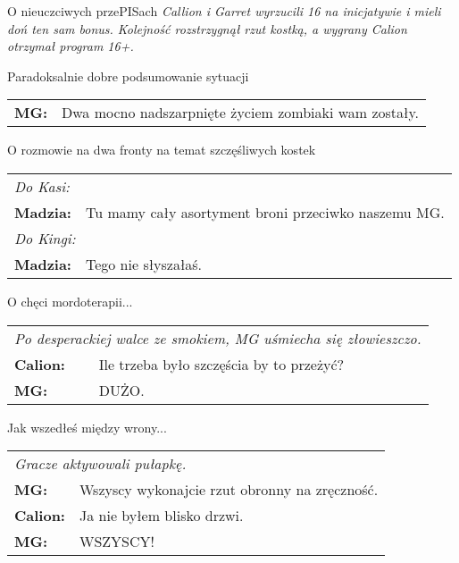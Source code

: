 \documentclass[10pt,twoside,twocolumn]{book}
\begin{document}
\begin{rpg-quotebox}{O nieuczciwych przePISach}
   \textit{Callion i Garret wyrzucili 16 na inicjatywie i mieli doń ten sam bonus. Kolejność rozstrzygnął rzut kostką, a wygrany Calion otrzymał program 16+.}
\end{rpg-quotebox}


\begin{rpg-quotebox}{Paradoksalnie dobre podsumowanie sytuacji}
   \begin{tabularx}{\columnwidth}{lX}
      \textbf{MG:} & Dwa mocno nadszarpnięte życiem zombiaki wam zostały.\\
   \end{tabularx}
\end{rpg-quotebox}


\begin{rpg-quotebox}{O rozmowie na dwa fronty na temat szczęśliwych kostek}
   \begin{tabularx}{\columnwidth}{lX}
      \multicolumn{2}{l}{\textit{Do Kasi:}} \\
      \textbf{Madzia:} & Tu mamy cały asortyment broni przeciwko naszemu MG. \\
      \multicolumn{2}{l}{\textit{Do Kingi:}} \\
      \textbf{Madzia:} & Tego nie słyszałaś.
   \end{tabularx}
\end{rpg-quotebox}


\begin{rpg-quotebox}{O chęci mordoterapii...}
   \begin{tabularx}{\columnwidth}{lX}
      \multicolumn{2}{X}{\textit{Po desperackiej walce ze smokiem, MG uśmiecha się złowieszczo.}}\\
      \textbf{Calion:} & Ile trzeba było szczęścia by to przeżyć? \\
      \textbf{MG:} & DUŻO.\\
   \end{tabularx}
\end{rpg-quotebox}


\begin{rpg-quotebox}{Jak wszedłeś między wrony...}
   \begin{tabularx}{\columnwidth}{lX}
      \multicolumn{2}{l}{\textit{Gracze aktywowali pułapkę.}}\\
      \textbf{MG:} & Wszyscy wykonajcie rzut obronny na zręczność.\\
      \textbf{Calion:} & Ja nie byłem blisko drzwi.\\
      \textbf{MG:} & WSZYSCY!\\
   \end{tabularx}
\end{rpg-quotebox}
\end{document}
